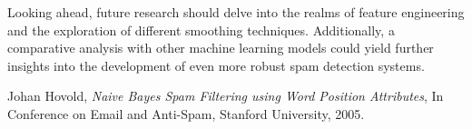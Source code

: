 \documentclass{acm_proc_article-sp}
\begin{document}
Looking ahead, future research should delve into the realms of feature engineering and the exploration of different smoothing techniques. Additionally, a comparative analysis with other machine learning models could yield further insights into the development of even more robust spam detection systems.

\begin{thebibliography}{9}

Johan Hovold, \textit{Naive Bayes Spam Filtering using Word Position Attributes},
In Conference on Email and Anti-Spam, Stanford University, 2005.

\end{thebibliography}
\end{document}
